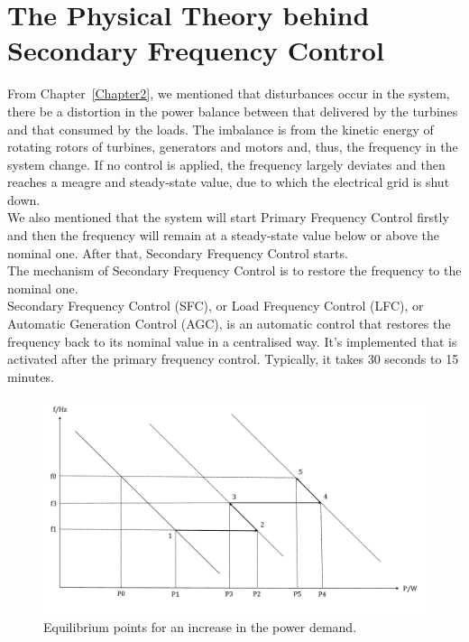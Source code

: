 \section{The Physical Theory behind Secondary Frequency Control} %

From Chapter~\ref{Chapter2}, we mentioned that disturbances occur in the system, there be a distortion in the power balance between that delivered by the turbines and that consumed by the loads. The imbalance is from the kinetic energy of rotating rotors of turbines, generators and motors and, thus, the frequency in the system change. If no control is applied, the frequency largely deviates and then reaches a meagre and steady-state value, due to which the electrical grid is shut down. \\ 

We also mentioned that the system will start Primary Frequency Control firstly and then the frequency will remain at a steady-state value below or above the nominal one. After that, Secondary Frequency Control starts.\\

The mechanism of Secondary Frequency Control is to restore the frequency to the nominal one. \\

Secondary Frequency Control (SFC), or Load Frequency Control (LFC), or Automatic Generation Control (AGC), is an automatic control that \cite{machowski2011power} restores the frequency back to its nominal value in a centralised way. It's implemented that is activated after the primary frequency control. Typically, it takes 30 seconds to 15 minutes.\\ 

\begin{figure}[t]
\center
\includegraphics[scale=0.4]{figure/3_1_Equilibrium.pdf}
\caption{Equilibrium points for an increase in the power demand.}
\label{3_1_Equilibrium}
\end{figure}

